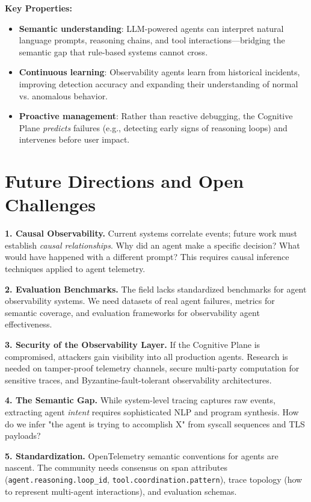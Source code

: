 \documentclass[sigplan,screen，review,9pt]{acmart}
\begin{document}
\textbf{Key Properties:}
\begin{itemize}
  \item \textbf{Semantic understanding}: LLM-powered agents can interpret natural language prompts, reasoning chains, and tool interactions—bridging the semantic gap that rule-based systems cannot cross.

  \item \textbf{Continuous learning}: Observability agents learn from historical incidents, improving detection accuracy and expanding their understanding of normal vs. anomalous behavior.

  \item \textbf{Proactive management}: Rather than reactive debugging, the Cognitive Plane \emph{predicts} failures (e.g., detecting early signs of reasoning loops) and intervenes before user impact.
\end{itemize}

\section{Future Directions and Open Challenges}

\textbf{1. Causal Observability.} Current systems correlate events; future work must establish \emph{causal relationships}. Why did an agent make a specific decision? What would have happened with a different prompt? This requires causal inference techniques applied to agent telemetry.

\textbf{2. Evaluation Benchmarks.} The field lacks standardized benchmarks for agent observability systems. We need datasets of real agent failures, metrics for semantic coverage, and evaluation frameworks for observability agent effectiveness.

\textbf{3. Security of the Observability Layer.} If the Cognitive Plane is compromised, attackers gain visibility into all production agents. Research is needed on tamper-proof telemetry channels, secure multi-party computation for sensitive traces, and Byzantine-fault-tolerant observability architectures.

\textbf{4. The Semantic Gap.} While system-level tracing captures raw events, extracting agent \emph{intent} requires sophisticated NLP and program synthesis. How do we infer "the agent is trying to accomplish X" from syscall sequences and TLS payloads?

\textbf{5. Standardization.} OpenTelemetry semantic conventions for agents are nascent. The community needs consensus on span attributes (\texttt{agent.reasoning.loop\_id}, \texttt{tool.coordination.pattern}), trace topology (how to represent multi-agent interactions), and evaluation schemas.
\end{document}
